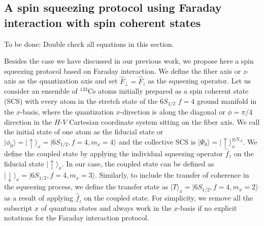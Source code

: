 \documentclass[preprint,aps,pra,onecolumn,superscriptaddress]{revtex4-1} %
\def\ket#1{\lvert{#1}\rangle}%
\newcommand{\comment}[1]{{\color{Maroon} #1}}
\begin{document}
\subsection{A spin squeezing protocol using Faraday interaction with spin coherent states}
\comment{To be done: Double check all equations in this section.}

Besides the case we have discussed in our previous work, we propose here a spin squeezing protocol based on Faraday interaction.
We define the fiber axis or $ z $-axis as the quantization axis and set $ \hat{F}_\perp=\hat{F}_z $ as the squeezing operator. 
Let us consider an ensemble of $ ^{133} $Cs atoms initially prepared as a spin coherent state (SCS) with every atom in the stretch state of the $ 6S_{1/2}$ $f=4 $ ground manifold in the $ x $-basis, where the quantization $ x $-direction is along the diagonal or $ \phi=\pi/4 $ direction in the $ H $-$ V $ Cartesian coordinate system sitting on the fiber axis.
We call the initial state of one atom as the fiducial state or $ \ket{\phi_0}=\ket{\uparrow}_x = \ket{6S_{1/2},f=4,m_x=4} $ and the collective SCS is $ \ket{\Psi_0}=\ket{\uparrow}_x^{\otimes N_A} $.
We define the coupled state by applying the individual squeezing operator $ \hat{f}_z$ on the fiducial state $\ket{\uparrow}_x $.
In our case, the coupled state can be defined as $ \ket{\downarrow}_x=\ket{6S_{1/2},f=4,m_x=3} $.
Similarly, to include the transfer of coherence in the squeezing process, we define the transfer state as $ \ket{T}_x=\ket{6S_{1/2},f=4,m_x=2} $ as a result of applying $ \hat{f}_z$ on the coupled state. 
For simplicity, we remove all the subscript $ x $ of quantum states and always work in the $ x $-basis if no explicit notations for the Faraday interaction protocol. 
\end{document}
